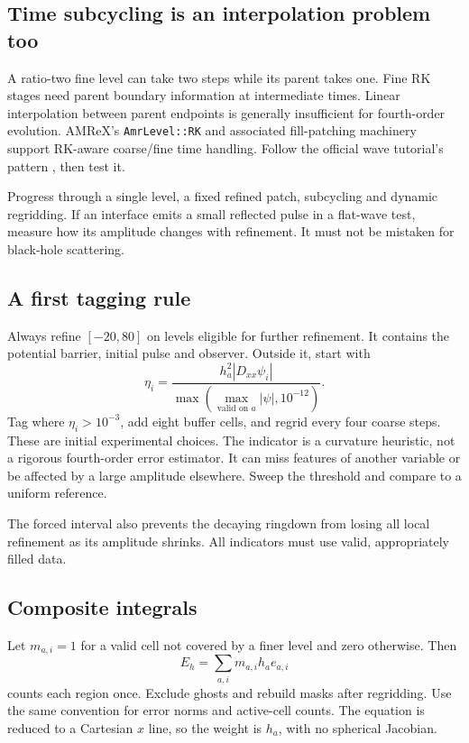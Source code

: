 \documentclass[11pt,a4paper]{article}
\numberwithin{equation}{section}
\newcommand{\code}[1]{\texttt{#1}}
\begin{document}
\subsection{Time subcycling is an interpolation problem too}
A ratio-two fine level can take two steps while its parent takes one.
Fine RK stages need parent boundary information at intermediate times.
Linear interpolation between parent endpoints is generally insufficient
for fourth-order evolution. AMReX's \code{AmrLevel::RK} and associated
fill-patching machinery support RK-aware coarse/fine time handling.
Follow the official wave tutorial's pattern \cite{wave}, then test it.

Progress through a single level, a fixed refined patch, subcycling and
dynamic regridding. If an interface emits a small reflected pulse in a
flat-wave test, measure how its amplitude changes with refinement. It
must not be mistaken for black-hole scattering.

\subsection{A first tagging rule}
Always refine $[-20,80]$ on levels eligible for further refinement.
It contains the potential barrier, initial pulse and observer.
Outside it, start with
\begin{equation}
 \eta_i=\frac{h_a^2|D_{xx}\psi_i|}
             {\max(\max_{\text{valid on }a}|\psi|,10^{-12})}.
\end{equation}
Tag where $\eta_i>10^{-3}$, add eight buffer cells, and regrid every
four coarse steps. These are initial experimental choices.
The indicator is a curvature heuristic, not a rigorous fourth-order error
estimator. It can miss features of another variable or be affected by a
large amplitude elsewhere. Sweep the threshold and compare to a uniform
reference.

The forced interval also prevents the decaying ringdown from losing all
local refinement as its amplitude shrinks. All indicators must use valid,
appropriately filled data.

\subsection{Composite integrals}
Let $m_{a,i}=1$ for a valid cell not covered by a finer level and zero
otherwise. Then
\begin{equation}\label{eq:composite}
 E_h=\sum_{a,i}m_{a,i}h_a e_{a,i}
\end{equation}
counts each region once. Exclude ghosts and rebuild masks after regridding.
Use the same convention for error norms and active-cell counts.
The equation is reduced to a Cartesian $x$ line, so the weight is $h_a$,
with no spherical Jacobian.
\end{document}
